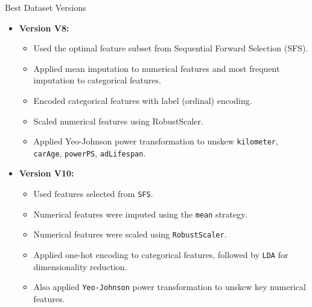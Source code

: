 \documentclass{beamer}
\begin{document}
\begin{frame}{Best Dataset Versions}
        \begin{itemize}
                \item \textbf{Version V8:}
                        \begin{itemize}
                                \item Used the optimal feature subset from
                                        Sequential Forward Selection (SFS).
                                \item Applied mean imputation to numerical
                                        features and most frequent imputation
                                        to categorical features.
                                \item Encoded categorical features with label
                                        (ordinal) encoding.
                                \item Scaled numerical features using
                                        RobustScaler.
                                \item Applied Yeo-Johnson power transformation
                                        to unskew \texttt{kilometer},
                                        \texttt{carAge}, \texttt{powerPS},
                                        \texttt{adLifespan}.
                        \end{itemize}
                \item \textbf{Version V10:}
                        \begin{itemize}
                                \item Used features selected from \texttt{SFS}.
                                \item Numerical features were imputed using the
                                        \texttt{mean} strategy.
                                \item Numerical features were scaled using 
                                        \texttt{RobustScaler}.
                                \item Applied one-hot encoding to categorical
                                        features, followed by \texttt{LDA} for
                                        dimensionality reduction.
                                \item Also applied \texttt{Yeo-Johnson} power
                                        transformation to unskew key numerical
                                        features.
                        \end{itemize}
        \end{itemize}
\end{frame}
\end{document}
